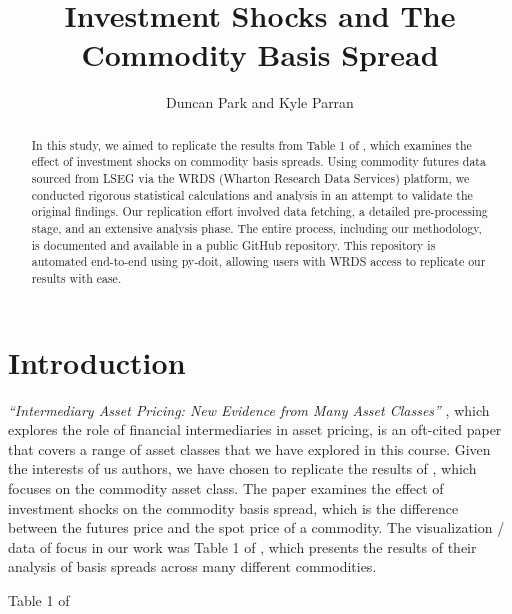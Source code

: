 \documentclass[12pt]{article}
\begin{document}
\title{
Investment Shocks and The Commodity Basis Spread}


\author{Duncan Park and Kyle Parran}
\begin{titlepage}
\maketitle


\begin{abstract}
In this study, we aimed to replicate the results from Table 1 of \cite{Yang2013}, which examines the effect of investment shocks on commodity basis spreads.
Using commodity futures data sourced from LSEG via the WRDS (Wharton Research Data Services) platform, we conducted rigorous statistical calculations and analysis in an attempt to validate the original findings.
Our replication effort involved data fetching, a detailed pre-processing stage, and an extensive analysis phase.
The entire process, including our methodology, is documented and available in a public GitHub repository.
This repository is automated end-to-end using py-doit, allowing users with WRDS access to replicate our results with ease.
\end{abstract}

\end{titlepage}

\section{Introduction}
\textit{``Intermediary Asset Pricing: New Evidence from Many Asset Classes''} \cite{He2017}, which explores the role of financial intermediaries in asset pricing, is an oft-cited paper that covers a range of asset classes that we have explored in this course.
Given the interests of us authors, we have chosen to replicate the results of \cite{Yang2013}, which focuses on the commodity asset class.
The paper examines the effect of investment shocks on the commodity basis spread, which is the difference between the futures price and the spot price of a commodity.
The visualization / data of focus in our work was Table 1 of \cite{Yang2013}, which presents the results of their analysis of basis spreads across many different commodities.

\newpage

\begin{table}[ht!]
  
  \caption{Table 1 of \cite{Yang2013}}
\end{table}
\end{document}
